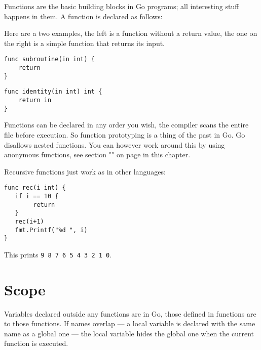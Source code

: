 
\noindent{}Functions are the basic building blocks in Go programs; all interesting
stuff happens in them. A function is declared as follows:

\showremarks
Here are a two examples, the left is a function without a return value,
the one on the right is a simple function that returns its input.

\begin{minipage}{.5\textwidth}
\begin{lstlisting}
func subroutine(in int) {
    return
}
\end{lstlisting}
\end{minipage}
\begin{minipage}{.5\textwidth}
\begin{lstlisting}
func identity(in int) int {
    return in
}
\end{lstlisting}
\end{minipage}

Functions can be declared in any order you wish, the compiler scans the
entire file before execution. So function prototyping is a thing of the
past in Go.
Go disallows nested functions.
You can however
work around this by using anonymous functions, see section
"" on page \pageref{sec:functions as values} 
in this chapter.

Recursive functions just work as in other languages:
\begin{lstlisting}[caption=Recursive function]
func rec(i int) {
   if i == 10 {
        return
   }
   rec(i+1)
   fmt.Printf("%d ", i)
}
\end{lstlisting}
This prints \texttt{9 8 7 6 5 4 3 2 1 0}.

\section{Scope}
Variables declared outside any functions are  in Go, those
defined in functions are  to those functions. If names overlap --- a
local variable is declared with the same name as a global one --- the
local variable hides the global one when the current function is
executed.

